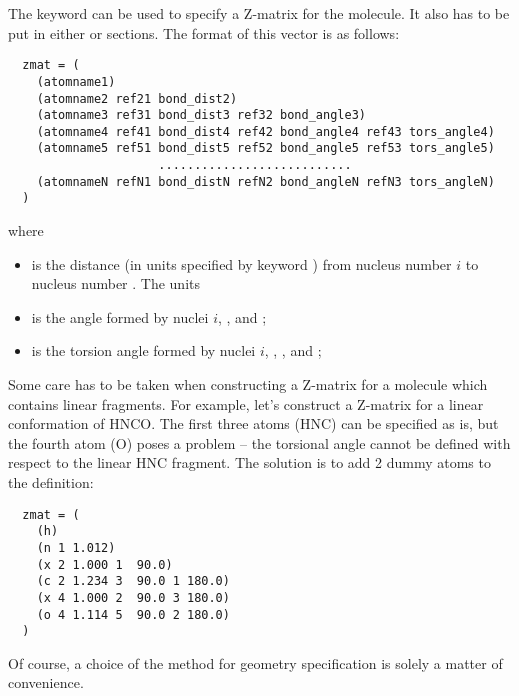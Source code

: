 The  keyword can be used to specify a Z-matrix for the molecule.
It also has to be put in either  or  sections.
The format of this vector is as follows:
\begin{verbatim}
  zmat = (
    (atomname1)
    (atomname2 ref21 bond_dist2)
    (atomname3 ref31 bond_dist3 ref32 bond_angle3)
    (atomname4 ref41 bond_dist4 ref42 bond_angle4 ref43 tors_angle4)
    (atomname5 ref51 bond_dist5 ref52 bond_angle5 ref53 tors_angle5)
                     ...........................
    (atomnameN refN1 bond_distN refN2 bond_angleN refN3 tors_angleN)
  )
\end{verbatim}
where
\begin{itemize}
\item {} is the distance (in units specified by
keyword ) from nucleus number $i$ to
nucleus number . The units 
\item {} is the angle formed by nuclei $i$,
, and ;
\item {} is the torsion angle formed by nuclei $i$,
, , and ;
\end{itemize}
Some care has to be taken when constructing a Z-matrix for a molecule
which contains linear fragments. For example, let's construct a Z-matrix
for a linear conformation of HNCO. The first three atoms (HNC) can be specified
as is, but the fourth atom (O) poses a problem -- the torsional angle cannot be
defined with respect to the linear HNC fragment. The solution is to add
2 dummy atoms to the definition:
\begin{verbatim}
  zmat = (
    (h)
    (n 1 1.012)
    (x 2 1.000 1  90.0)
    (c 2 1.234 3  90.0 1 180.0)
    (x 4 1.000 2  90.0 3 180.0)
    (o 4 1.114 5  90.0 2 180.0)
  )
\end{verbatim}

Of course, a choice of the method for geometry specification is solely
a matter of convenience.

